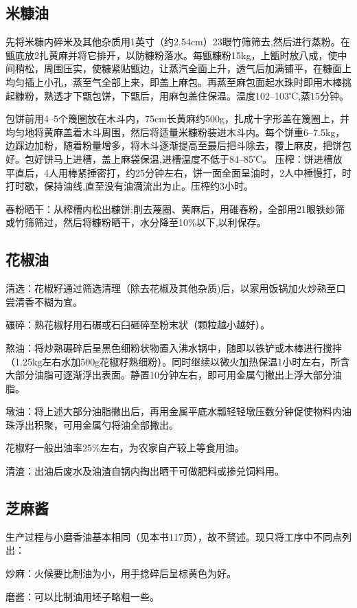 \documentclass{ctexbook}
\begin{document}
\subsection{米糠油}
先将米糠内碎米及其他杂质用1英寸（约2.54cm）23眼竹筛筛去,然后进行蒸粉。在甑底放2扎黄麻并将它排开，以防糠粉落水。每甑糠粉15kg，上甑时放八成，使中间稍松，周围压实，使糠紧贴甑边，让蒸汽全面上升，透气后加满铺平，在糠面上均匀插上小孔，蒸至气全部上来，即盖上麻包。再蒸至麻包面起水珠时即用木棒挑起糠粉，熟透才下甑包饼，下甑后，用麻包盖住保温。温度102--103℃,蒸15分钟。

包饼前用4--5个篾圈放在木斗内，75cm长黄麻约500g，扎成十字形盖在篾圈上，并均匀地将黄麻盖着木斗周围，然后将适量米糠粉装进木斗内。每个饼重6--7.5kg，边踩边加粉，随着粉量增多，将木斗逐渐提高至最后把斗除去，覆上麻皮，把饼包好。包好饼马上进槽，盖上麻袋保温,进槽温度不低于84--85℃。
压榨：饼进槽放平直后，4人用棒紧捶密打，约25分钟左右，饼一面全面呈油时，2人中棰慢打，时打时歇，保持油线,直至没有油滴流出为止。压榨约3小时。

舂粉晒干：从榨槽内松出糠饼;削去蔑圈、黄麻后，用碓舂粉，全部用21眼铁纱筛或竹筛筛过，然后将糠粉晒干，水分降至10\%以下,以利保存。

\subsection{花椒油}
清选：花椒籽通过筛选清理（除去花椒及其他杂质)后，以家用饭锅加火炒熟至口尝清香不糊为宜。

碾碎：熟花椒籽用石碾或石臼砸碎至粉末状（颗粒越小越好）。

熬油：将炒熟碾碎后呈黑色细粉状物置入沸水锅中，随即以铁铲或木棒进行搅拌（1.25kg左右水加500g花椒籽熟细粉）。同时继续以微火加热保温1小时左右，所含大部分油脂可逐渐浮出表面。静置10分钟左右，即可用金属勺撇出上浮大部分油脂。

墩油：将上述大部分油脂撇出后，再用金属平底水瓢轻轻墩压数分钟促使物料内油珠浮出积聚，可用金属勺将油全部撇出。

花椒籽一般出油率25\%左右，为农家自产较上等食用油。

清渣：出油后废水及油渣自锅内掏出晒干可做肥料或掺兑饲料用。
\subsection{芝麻酱}
生产过程与小磨香油基本相同（见本书117页），故不赘述。现只将工序中不同点列出：

炒麻：火候要比制油为小，用手捻碎后呈棕黄色为好。

磨酱：可以比制油用坯子略粗一些。
\end{document}
